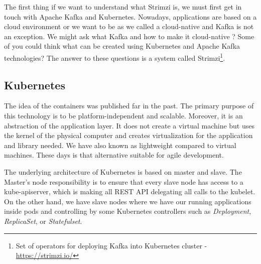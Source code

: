 \documentclass{ExcelAtFIT}
\begin{document}
The first thing if we want to understand what Strimzi is, we must first get in touch with Apache Kafka and Kubernetes. Nowadays, applications are based on a cloud environment or we want to be as we called a cloud-native and Kafka is not an exception. We might ask what Kafka and how to make it cloud-native ? Some of you could think what can be created using Kubernetes and Apache Kafka technologies? The answer to these questions is a system called Strimzi\footnote{Set of operators for deploying Kafka into Kubernetes cluster - \url{https://strimzi.io/}}.

\subsection{Kubernetes}

The idea of the containers was published far in the past. The primary purpose of this technology is to be platform-independent and scalable. Moreover, it is an abstraction of the application layer. It does not create a virtual machine but uses the kernel of the physical computer and creates virtualization for the application and library needed. We have also known as lightweight compared to virtual machines. These days is that alternative suitable for agile development.

The underlying architecture of Kubernetes \cite{Kubernetes} is based on master and slave. The Master's node responsibility is to ensure that every slave node has access to a kube-apiserver, which is making all REST API delegating all calls to the kubelet. On the other hand, we have slave nodes where we have our running applications inside pods and controlling by some Kubernetes controllers such as \emph{Deployment}, \emph{ReplicaSet}, or \emph{Statefulset}.  
\end{document}
